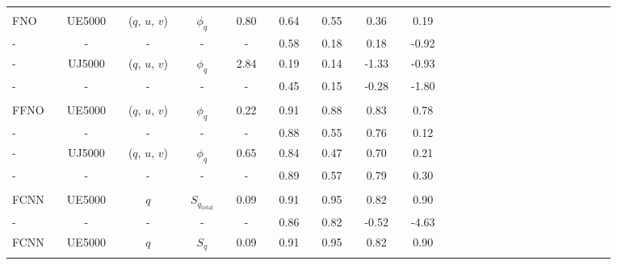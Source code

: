 \begin{table}[H]
\begin{tabular}{llclclclclclclclclclclclclclclcl}
\hline \\[-1.4em]
FNO         &  & UE5000           &  & ($q$, $u$, $v$)  &  & $\phi_q$ &  & 0.80                 &  & 0.64              &  & 0.55              &  & 0.36             &  & 0.19             \\ \rowcolor{Gray}
-     		&  & -                &  & -				&  & -        &  & -                    &  & 0.58              &  & 0.18              &  & 0.18             &  & -0.92             \\ 
-     		&  & UJ5000           &  & ($q$, $u$, $v$)  &  & $\phi_q$ &  & 2.84                 &  & 0.19              &  & 0.14              &  & -1.33            &  & -0.93             \\ \rowcolor{Gray}
-     		&  & -                &  & -				&  & -        &  & -                    &  & 0.45              &  & 0.15              &  & -0.28            &  & -1.80             \\ 
\hline \\[-1.4em]
FFNO        &  & UE5000           &  & ($q$, $u$, $v$)  &  & $\phi_q$ &  & 0.22                 &  & 0.91              &  & 0.88              &  & 0.83             &  & 0.78             \\ \rowcolor{Gray}
-     		&  & -                &  & -				&  & -        &  & -                    &  & 0.88              &  & 0.55              &  & 0.76             &  & 0.12             \\ 
-     		&  & UJ5000           &  & ($q$, $u$, $v$)  &  & $\phi_q$ &  & 0.65                 &  & 0.84              &  & 0.47              &  & 0.70             &  & 0.21             \\ \rowcolor{Gray}
-     		&  & -                &  & -				&  & -        &  & -                    &  & 0.89              &  & 0.57              &  & 0.79             &  & 0.30             \\ [0.2em]
\hline \\[-1.4em]
FCNN      &  & UE5000      &  & $q$       &   & $S_{q_{\text{total}}}$     &  & 0.09      &  & 0.91       &  & 0.95     &  & 0.82      &  & 0.90         \\ \rowcolor{Blue}
-     		&  & -                  &  & -            &   &  -                                       &  &  -           &  & 0.86      &  & 0.82     &  & -0.52     &  & -4.63        \\ 
FCNN      &  & UE5000      &  & $q$       &   & $S_q$                               &  & 0.09      &  & 0.91       &  & 0.95     &  & 0.82      &  & 0.90             \\ \rowcolor{Blue}

\end{tabular}
\end{table}
